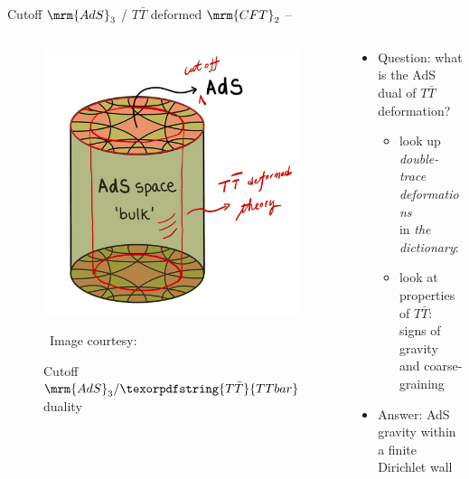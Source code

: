 \documentclass[aspectratio=169,10pt
	,noamsthm
]{beamer}
\newcommand{\TTbar}{\texorpdfstring{\ensuremath{T\bar{T}}}{TTbar}\xspace}
\begin{document}
\newcommand{\figCutoffAds}{
\begin{figure}[!h]
	\hfill\includegraphics[width=.8\linewidth]{img/cutoff-ads.jpg}

	\centering
	\vspace{-.3\baselineskip}
	\caption{Cutoff $\mrm{AdS}_3/\TTbar$ duality}
	
	\vspace{-.3\baselineskip}
	\scriptsize\ Image courtesy: \textcite{AldegundePWSep22}
\end{figure}
}

\begin{frame}{Cutoff $\mrm{AdS}_3$ / \TTbar deformed $\mrm{CFT}_2$}{%
	\textcite{McGough:2016lol} --
}
\begin{columns}
\begin{column}{.4\textwidth}
\figCutoffAds
\end{column}
\begin{column}{.6\textwidth}
	\begin{itemize}
	\item Question: what is the AdS dual of \TTbar deformation?\\
	
	\begin{itemize}
	\item look up \textit{double-trace deformations}\\
	in \textit{the dictionary}:\\
	\textcite{Heemskerk:2010hk}
	
\pause
	\item look at properties of \TTbar:\\
	signs of gravity and coarse-graining\\
	\textcite{Dubovsky:2012wk,Dubovsky:2013ira}
	\end{itemize}
	
	\pause
	\item Answer: AdS gravity within a finite Dirichlet wall
	
	\end{itemize}
\end{column}
\end{columns}
\end{frame}
\end{document}

